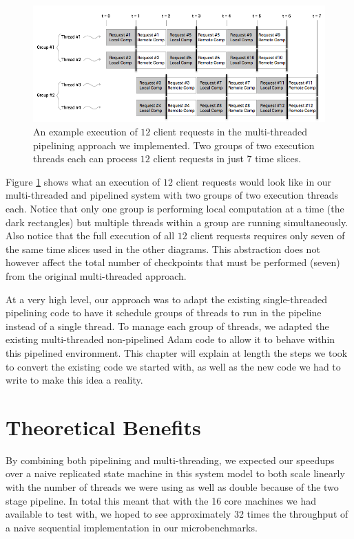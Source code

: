 \documentclass[11pt, oneside]{report}
\begin{document}
\begin{figure}[h]
\centering
\includegraphics[width=1.0\textwidth]{PipelinedParallel.png}
\caption{\label{parpipe}An example execution of $12$ client requests in the multi-threaded pipelining approach we implemented. Two groups of two execution threads each can process $12$ client requests in just $7$ time slices.}
\end{figure}

Figure \ref{parpipe} shows what an execution of $12$ client requests would look like in our multi-threaded and pipelined system with two groups of two execution threads each. 
Notice that only one group is performing local computation at a time (the dark rectangles) but multiple threads within a group are running simultaneously.
Also notice that the full execution of all $12$ client requests requires only seven of the same time slices used in the other diagrams.
This abstraction does not however affect the total number of checkpoints that must be performed (seven) from the original multi-threaded approach.

At a very high level, our approach was to adapt the existing single-threaded pipelining code to have it schedule groups of threads to run in the pipeline instead of a single thread. 
To manage each group of threads, we adapted the existing multi-threaded non-pipelined Adam code to allow it to behave within this pipelined environment. 
This chapter will explain at length the steps we took to convert the existing code we started with, as well as the new code we had to write to make this idea a reality.

\section{Theoretical Benefits}

By combining both pipelining and multi-threading, we expected our speedups over a naive replicated state machine in this system model to both scale linearly with the number of threads we were using as well as double because of the two stage pipeline. 
In total this meant that with the 16 core machines we had available to test with, we hoped to see approximately 32 times the throughput of a naive sequential implementation in our microbenchmarks. 
\end{document}
